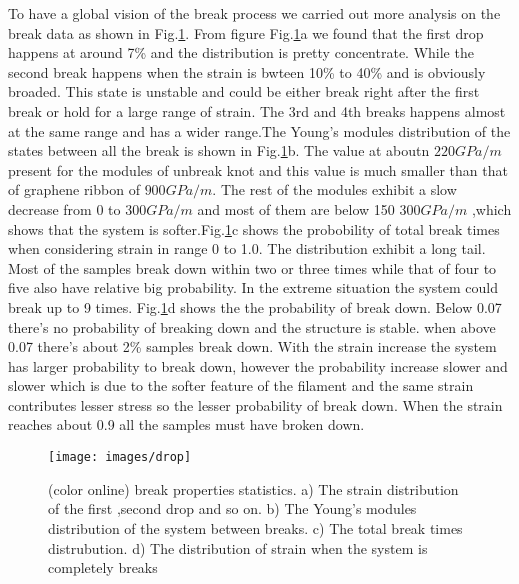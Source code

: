 \documentclass[%
 reprint,
 amsmath,amssymb,
 aps,
prb,
]{revtex4-1}
\begin{document}
To have a global vision of the break process we carried out more analysis on the break data as shown in Fig.\ref{fig:drop}. From figure Fig.\ref{fig:drop}a we found that the first drop happens at around 7\%  and the distribution is pretty concentrate. While the second break happens when the strain is bwteen 10\% to 40\% and is obviously broaded. This state is unstable and could be either break right after the first break or hold for a large range of strain. The 3rd and 4th breaks happens almost at the same range and has a wider range.The Young's modules distribution of the states between all the break is shown in Fig.\ref{fig:drop}b. The value at aboutn $220GPa/m$ present for the modules of unbreak knot and this value is much smaller than that of graphene ribbon of $900GPa/m$. The rest of the modules exhibit a slow decrease from 0 to $300GPa/m$ and most of them are below 150 $300GPa/m$ ,which shows that the system is softer.Fig.\ref{fig:drop}c shows the probobility of total break times when considering strain in range 0 to 1.0. The distribution exhibit a long tail.  Most of the samples break down within two or three times while that of four to five also have relative big probability. In the extreme situation the system could break up to 9 times. Fig.\ref{fig:drop}d shows the the probability of break down. Below 0.07 there's no probability of breaking down and the structure is stable. when above 0.07 there's about 2\% samples break down. With the strain increase the system has larger probability to break down, however the probability increase slower and slower which is due to the softer feature of the filament and the same strain contributes lesser
stress so the lesser probability of break down. When the strain reaches about 0.9 all the samples must have broken down.

\begin{figure}[b]
  \texttt{[image: images/drop]}
  \caption{\label{fig:drop}  (color online) break properties statistics. a) The strain distribution of the first ,second drop and so on. b) The Young's modules distribution of the system between breaks. c) The total break times distrubution. d) The distribution of strain when the system is completely breaks}
\end{figure}
\end{document}
